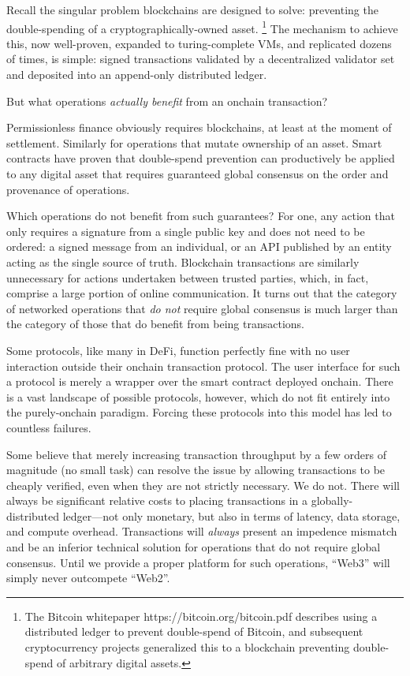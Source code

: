 \documentclass[runningheads]{llncs}
\begin{document}
Recall the singular problem blockchains are designed to solve: preventing the double-spending of a cryptographically-owned asset.
\footnote{The Bitcoin whitepaper https://bitcoin.org/bitcoin.pdf describes using a distributed ledger to prevent double-spend of Bitcoin, and subsequent cryptocurrency projects generalized this to a blockchain preventing double-spend of arbitrary digital assets.}
The mechanism to achieve this, now well-proven, expanded to turing-complete VMs, and replicated dozens of times, is simple: signed transactions validated by a decentralized validator set and deposited into an append-only distributed ledger.

But what operations \textit{actually benefit} from an onchain transaction?

Permissionless finance obviously requires blockchains, at least at the moment of settlement.
Similarly for operations that mutate ownership of an asset.
Smart contracts have proven that double-spend prevention can productively be applied to any digital asset that requires guaranteed global consensus on the order and provenance of operations.

Which operations do not benefit from such guarantees?
For one, any action that only requires a signature from a single public key and does not need to be ordered:
a signed message from an individual, or an API published by an entity acting as the single source of truth.
Blockchain transactions are similarly unnecessary for actions undertaken between trusted parties, which, in fact, comprise a large portion of online communication.
It turns out that the category of networked operations that \textit{do not} require global consensus is much larger than the category of those that do benefit from being transactions.

Some protocols, like many in DeFi, function perfectly fine with no user interaction outside their onchain transaction protocol.
The user interface for such a protocol is merely a wrapper over the smart contract deployed onchain.
There is a vast landscape of possible protocols, however, which do not fit entirely into the purely-onchain paradigm.
Forcing these protocols into this model has led to countless failures.

Some believe that merely increasing transaction throughput by a few orders of magnitude (no small task) can resolve the issue by allowing transactions to be cheaply verified, even when they are not strictly necessary.
We do not.
There will always be significant relative costs to placing transactions in a globally-distributed ledger—not only monetary, but also in terms of latency, data storage, and compute overhead.
Transactions will \textit{always} present an impedence mismatch and be an inferior technical solution for operations that do not require global consensus.
Until we provide a proper platform for such operations, ``Web3'' will simply never outcompete ``Web2''.
\end{document}
